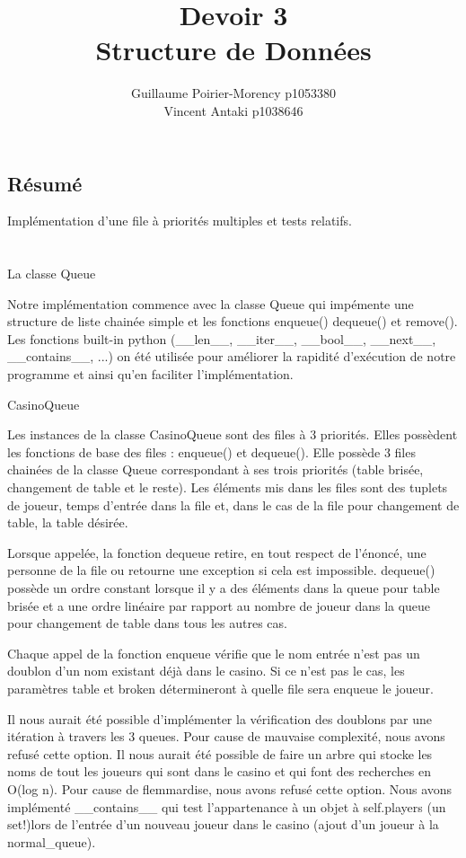 \documentclass[french]{article}
\title{Devoir 3 \\Structure de Données}
\author{Guillaume Poirier-Morency p1053380 \\ Vincent Antaki p1038646}
\begin{document}
\maketitle
\subsection{Résumé}

Implémentation d'une file à priorités multiples et tests relatifs.

\section{}


\section{}

La classe Queue

Notre implémentation commence avec la classe Queue qui impémente une structure 
de liste chainée simple et les fonctions enqueue() dequeue() et remove(). Les 
fonctions built-in python 
(\_\_len\_\_, \_\_iter\_\_, \_\_bool\_\_, \_\_next\_\_, \_\_contains\_\_, ...) 
on été utilisée pour améliorer la rapidité d'exécution de notre programme et 
ainsi qu'en faciliter l'implémentation.

CasinoQueue

Les instances de la classe CasinoQueue sont des files à 3 priorités. Elles 
possèdent les fonctions de base des files : enqueue() et dequeue(). Elle 
possède 3 files chainées de la classe Queue correspondant à ses trois 
priorités (table brisée, changement de table et le reste). Les éléments mis 
dans les files sont des tuplets de joueur, temps d'entrée dans la file et, 
dans le cas de la file pour changement de table, la table désirée.  

Lorsque appelée, la fonction dequeue retire, en tout respect de l'énoncé, une 
personne de la file ou retourne une exception si cela est impossible. 
dequeue() possède un ordre constant lorsque il y a des éléments dans la queue 
pour table brisée et a une ordre linéaire par rapport au nombre de joueur dans 
la queue pour changement de table dans tous les autres cas.

Chaque appel de la fonction enqueue vérifie que le nom entrée n'est pas un 
doublon d'un nom existant déjà dans le casino. Si ce n'est pas le cas, les 
paramètres table et broken détermineront à quelle file sera enqueue le joueur.

Il nous aurait été possible d'implémenter la vérification des doublons par une 
itération à travers les 3 queues. Pour cause de mauvaise complexité, nous 
avons refusé cette option. Il nous aurait été possible de faire un arbre qui 
stocke les noms de tout les joueurs qui sont dans le casino et qui font des 
recherches en O(log n). Pour cause de flemmardise, nous avons refusé cette 
option. Nous avons implémenté \_\_contains\_\_ qui test l'appartenance à un 
objet à self.players (un set!)lors de l'entrée d'un nouveau joueur dans le 
casino (ajout d'un joueur à la normal\_queue).
\end{document}
